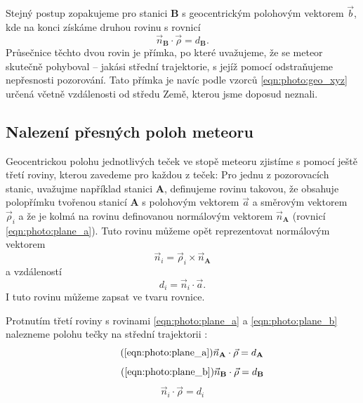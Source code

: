 \medskip

Stejný postup zopakujeme pro stanici \textbf{B} s geocentrickým polohovým vektorem $\vec{b}$, kde na konci získáme druhou rovinu s rovnicí
\begin{equation}
    \vec{n}_\mathbf{B}\cdot \vec{\rho}=d_\mathbf{B}\text{.}
    \label{eqn:photo:plane_b}
\end{equation}
Průsečnice těchto dvou rovin je přímka, po které uvažujeme, že se meteor skutečně pohyboval -- jakási střední trajektorie, s jejíž pomocí odstraňujeme nepřesnosti pozorování. Tato přímka je navíc podle vzorců \eqref{eqn:photo:geo_xyz} určená včetně vzdálenosti od středu Země, kterou jsme doposud neznali.

\subsection{Nalezení přesných poloh meteoru}%
Geocentrickou polohu jednotlivých teček ve stopě meteoru zjistíme s pomocí ještě třetí roviny, kterou zavedeme pro každou z teček: Pro jednu z pozorovacích stanic, uvažujme například stanici \textbf{A}, definujeme rovinu takovou, že obsahuje polopřímku tvořenou stanicí \textbf{A} s polohovým vektorem $\vec{a}$ a směrovým vektorem $\vec{\rho}_i$ a že je kolmá na rovinu definovanou normálovým vektorem $\vec{n}_\mathbf{A}$ (rovnicí \eqref{eqn:photo:plane_a}). Tuto rovinu můžeme opět reprezentovat normálovým vektorem \cite{ceplecha}
\begin{equation}
    \vec{n}_i=\vec{\rho}_i\times\vec{n}_\mathbf{A}
\end{equation}
a vzdáleností
\begin{equation}
    d_i=\vec{n}_i\cdot \vec{a}\text{.}
\end{equation}
I tuto rovinu můžeme zapsat ve tvaru rovnice.

Protnutím třetí roviny s rovinami \eqref{eqn:photo:plane_a} a \eqref{eqn:photo:plane_b} nalezneme polohu tečky na střední trajektorii \cite{ceplecha}:
\begin{equation}
    \tag{\ref{eqn:photo:plane_a}}
    \vec{n}_\mathbf{A}\cdot\vec{\rho}=d_\mathbf{A}
\end{equation}
\begin{equation}
    \tag{\ref{eqn:photo:plane_b}}
    \vec{n}_\mathbf{B}\cdot\vec{\rho}=d_\mathbf{B}
\end{equation}
\begin{equation}
    \vec{n}_i\cdot\vec{\rho}=d_i
\end{equation}

